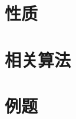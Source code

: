 


\section*{性质}
\label{prime:prop:gcdlcm}






\section*{相关算法}
\label{prime:sec:gcdlcm-algo}





\section*{例题}
\label{prime:sec:gcdlcm-example}



